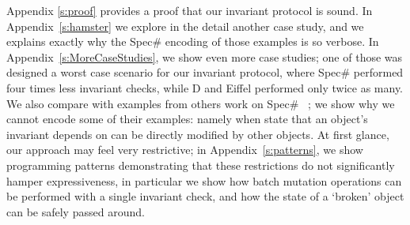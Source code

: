 Appendix \ref{s:proof} provides a proof that our invariant protocol is sound. In
Appendix~\ref{s:hamster} we explore in the detail another case study, and we explains exactly why the 
Spec\# encoding of those examples is so verbose.
In Appendix~\ref{s:MoreCaseStudies}, we show even more case studies; one of those was designed a worst case scenario for our invariant protocol, where Spec\# 
performed four times less invariant checks,
 while D and Eiffel performed only twice as many.
We also compare with examples from others work on Spec\# ~\cite{DBLP:journals/jot/BarnettDFLS04,leino2004object,DBLP:conf/mpc/BarnettN04}; we show why we cannot encode some of their examples: namely when state that an object's invariant depends on can be directly modified by other objects.
At first glance, our approach may feel very restrictive; in Appendix~\ref{s:patterns}, we show
programming patterns demonstrating that these restrictions do not significantly hamper expressiveness, in particular we show how batch mutation operations can be performed with a single invariant check, and how the state of a `broken' object can be safely passed around.


